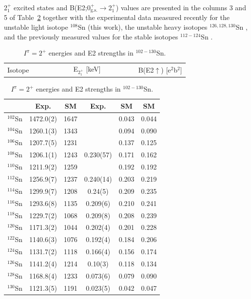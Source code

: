 \documentclass[prc,twocolumn,amssymb,amsmath,showpacs,superscriptaddress]{revtex4}
\begin{document}
2$^+_1$ excited states and B(E2;0$^+_{\text{g.s.}}$$\to$2$^+_1$)
values are presented in the columns 3 and 5 of Table~\ref{tab-2}
together with the experimental data measured recently for the
unstable light isotope $^{108}$Sn (this work), the unstable heavy
isotopes $^{126,128,130}$Sn \cite{rad04}, and the previously
measured values for the stable isotopes $^{112-124}$Sn
\cite{ram01}.
\begin{table}[htb]
\caption{$I^\pi=2^+$ energies and E2 strengths in
$^{102-130}$Sn.}\label{tab-2}
\begin{tabular}[t]{llrll}
\hline \hline \vspace{5pt}
Isotope&~~~~~~~~~& E$_{2^{+}_{1}}$ [keV] & ~~~~~~~& B(E2$\uparrow$) [e$^2$b$^2$]   \\
\end{tabular}
\begin{tabular}{cccccc}
           & Exp.\footnotemark[1] & SM\footnotemark[2] & Exp. & SM\footnotemark[2]&
SM\footnotemark[3]   \\
\hline \hline
$^{102}$Sn & 1472.0(2) & 1647 & & 0.043 &0.044  \\
$^{104}$Sn & 1260.1(3) & 1343 & & 0.094 &  0.090\\
$^{106}$Sn & 1207.7(5) & 1231 & & 0.137 & 0.125 \\
$^{108}$Sn & 1206.1(1) & 1243 & 0.230(57)\footnotemark[4] & 0.171 &0.162  \\
$^{110}$Sn & 1211.9(2) & 1259 & & 0.192   &0.192\\
$^{112}$Sn & 1256.9(7) & 1237 & 0.240(14)\footnotemark[1] & 0.203& 0.219  \\
$^{114}$Sn & 1299.9(7) & 1208 & 0.24(5)\footnotemark[1] & 0.209  & 0.235 \\
$^{116}$Sn & 1293.6(8) & 1135 & 0.209(6)\footnotemark[1] & 0.210 & 0.241\\
$^{118}$Sn & 1229.7(2) & 1068 & 0.209(8)\footnotemark[1] & 0.208  & 0.239\\
$^{120}$Sn & 1171.3(2) & 1044 & 0.202(4)\footnotemark[1] & 0.201  & 0.228\\
$^{122}$Sn & 1140.6(3) & 1076 & 0.192(4)\footnotemark[1] & 0.184  &0.206 \\
$^{124}$Sn & 1131.7(2) & 1118 & 0.166(4)\footnotemark[1] & 0.156  & 0.174\\
$^{126}$Sn & 1141.2(4) & 1214 & 0.10(3)\footnotemark[5] & 0.118   &0.134\\
$^{128}$Sn & 1168.8(4) & 1233 & 0.073(6)\footnotemark[5] & 0.079  & 0.090\\
$^{130}$Sn & 1121.3(5) & 1191 & 0.023(5)\footnotemark[5] & 0.042  &0.047 \\
\hline \hline
\end{tabular}
 
 
\end{table}
\end{document}
